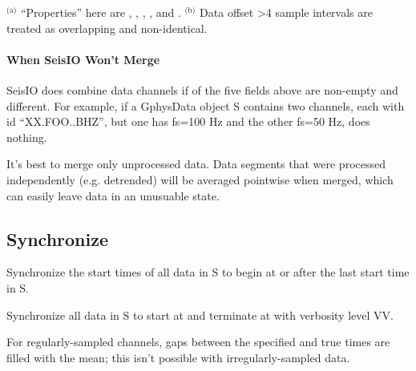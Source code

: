 \documentclass[letterpaper,11pt,english]{sphinxmanual}
\begin{document}
$^{\text{(a)}}$ “Properties” here are , , , , and .
$^{\text{(b)}}$ Data offset \textgreater{}4 sample intervals are treated as overlapping and non-identical.


\paragraph{When SeisIO Won’t Merge}
\label{\detokenize{src/Processing/processing:when-seisio-won-t-merge}}
SeisIO does  combine data channels if  of the five fields above
are non-empty and different. For example, if a GphysData object S contains two
channels, each with id “XX.FOO..BHZ”, but one has fs=100 Hz and the other fs=50 Hz,
 does nothing.

It’s best to merge only unprocessed data. Data segments that were processed
independently (e.g. detrended) will be averaged pointwise when merged, which
can easily leave data in an unusuable state.


\subsection{Synchronize}
\label{\detokenize{src/Processing/processing:synchronize}}

\begin{fulllineitems}
\end{fulllineitems}


Synchronize the start times of all data in S to begin at or after the last
start time in S.


\begin{fulllineitems}
\end{fulllineitems}


Synchronize all data in S to start at  and terminate at  with verbosity level VV.

For regularly-sampled channels, gaps between the specified and true times
are filled with the mean; this isn’t possible with irregularly-sampled data.
\end{document}
